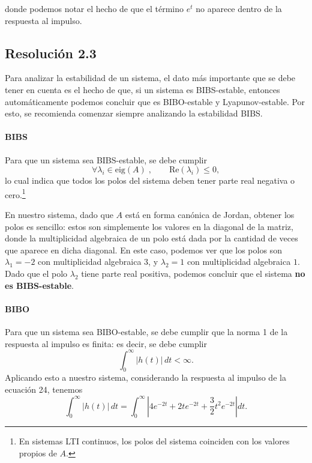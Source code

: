 \documentclass[
  11pt,
  letterpaper,
   addpoints,
   answers
  ]{exam}
\begin{document}
\begin{questions}
\begin{solution}
donde podemos notar el hecho de que el término $e^{t}$ no aparece dentro de la respuesta al impulso.

\subsection*{Resolución 2.3}

Para analizar la estabilidad de un sistema, el dato más importante que se debe tener en cuenta
es el hecho de que, si un sistema es BIBS-estable, entonces automáticamente podemos concluir
que es BIBO-estable y Lyapunov-estable. Por esto, se recomienda comenzar siempre analizando la
estabilidad BIBS.

\paragraph*{BIBS}
Para que un sistema sea BIBS-estable, se debe cumplir
\setcounter{equation}{24}
\begin{equation}
\forall \lambda_i \in \mathrm{eig}(A)\;,\qquad \mathrm{Re}(\lambda_i)\le 0,
\end{equation}
lo cual indica que todos los polos del sistema
deben tener parte real negativa o cero.\footnote{En sistemas LTI continuos, los polos del sistema coinciden con los valores propios de $A$.}

En nuestro sistema, dado que $A$ está en forma canónica de Jordan, obtener los polos es sencillo:
estos son simplemente los valores en la diagonal de la matriz, donde la multiplicidad algebraica de
un polo está dada por la cantidad de veces que aparece en dicha diagonal. En este caso, podemos ver
que los polos son $\lambda_1=-2$ con multiplicidad algebraica $3$, y $\lambda_2=1$ con multiplicidad algebraica $1$.
Dado que el polo $\lambda_2$ tiene parte real positiva, podemos concluir que el sistema \textbf{no es BIBS-estable}.

\paragraph*{BIBO}
Para que un sistema sea BIBO-estable, se debe cumplir que la norma 1 de la respuesta al
impulso es finita: es decir, se debe cumplir
\begin{equation}
\int_{0}^{\infty} |h(t)|\,dt < \infty.
\end{equation}
Aplicando esto a nuestro sistema, considerando la respuesta al impulso de la ecuación 24, tenemos
\begin{equation}
\int_{0}^{\infty} |h(t)|\,dt
=\int_{0}^{\infty} \left|4e^{-2t}+2t e^{-2t}+\frac{3}{2}t^{2}e^{-2t}\right| dt.
\end{equation}


\end{solution}
\end{questions}
\end{document}
